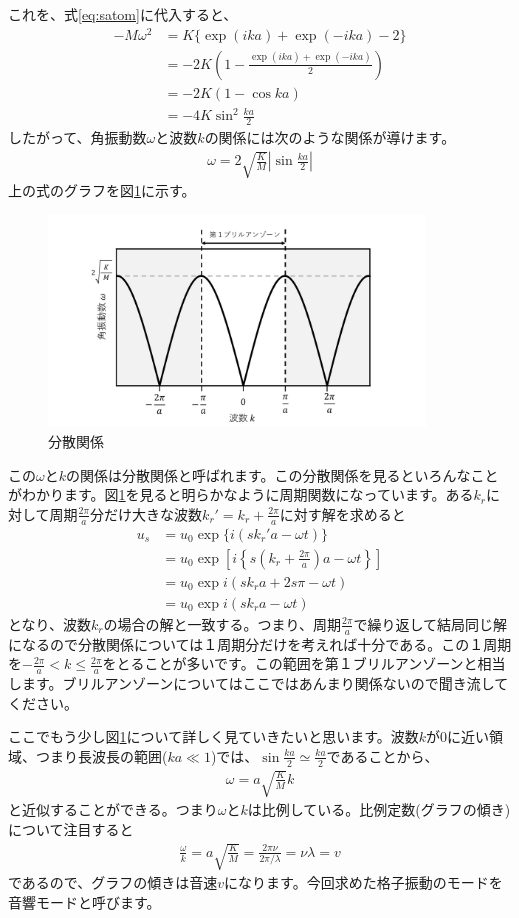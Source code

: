 \documentclass[10pt,b5paper,papersize,dvipdfmx]{jsbook}
\begin{document}
これを、式\ref{eq:satom}に代入すると、
\begin{align}
  -M\omega^2 &= K\{\exp(ika) + \exp(-ika) - 2\} \\
             &= -2K\left(1-\frac{\exp(ika) + \exp(-ika)}{2}\right) \\
             &= -2K(1-\cos ka)\\
             &= -4K\sin^2\frac{ka}{2}
\end{align}
したがって、角振動数$\omega$と波数$k$の関係には次のような関係が導けます。
\begin{align}
  \omega = 2 \sqrt{\frac{K}{M}} \left| \sin \frac{ka}{2}\right|
\end{align}
上の式のグラフを図\ref{fig:bunnsan}に示す。
\begin{figure}[htbp]
  \centering
  \includegraphics[width=10cm]{img/bunsann.pdf}  %
  \caption{分散関係}
  \label{fig:bunnsan}
\end{figure}
この$\omega$と$k$の関係は分散関係と呼ばれます。この分散関係を見るといろんなことがわかります。図\ref{fig:bunnsan}を見ると明らかなように周期関数になっています。ある$k_r$に対して周期$\frac{2\pi}{a}$分だけ大きな波数$k_r' = k_r + \frac{2\pi}{a}$に対す解を求めると
\begin{align}
  u_s &= u_0 \exp\{i(sk_r'a - \omega t)\}\\
      &= u_0 \exp \left[i\left\{s \left(k_r + \frac{2\pi}{a}\right)a-\omega t\right\}\right]\\
      & = u_0 \exp {i(sk_ra + 2s\pi - \omega t)}\\
      & = u_0 \exp {i(sk_ra -\omega t)}
\end{align}
となり、波数$k_r$の場合の解と一致する。つまり、周期$\frac{2\pi}{a}$で繰り返して結局同じ解になるので分散関係については１周期分だけを考えれば十分である。この１周期を$-\frac{2\pi}{a} < k\leq \frac{2\pi}{a}$をとることが多いです。この範囲を第１ブリルアンゾーンと相当します。ブリルアンゾーンについてはここではあんまり関係ないので聞き流してください。\par
ここでもう少し図\ref{fig:bunnsan}について詳しく見ていきたいと思います。波数$k$が$0$に近い領域、つまり長波長の範囲($ka \ll 1$)では、$\sin \frac{ka}{2} \simeq \frac{ka}{2}$であることから、
\begin{align}
  \omega = a \sqrt{\frac{K}{M}}k
\end{align}
と近似することができる。つまり$\omega$と$k$は比例している。比例定数(グラフの傾き)について注目すると
\begin{align}
  \frac{\omega}{k} =a \sqrt{\frac{K}{M}}= \frac{2\pi\nu}{2\pi/\lambda} = \nu \lambda = v
\end{align}
であるので、グラフの傾きは音速$v$になります。今回求めた格子振動のモードを音響モードと呼びます。
\end{document}
